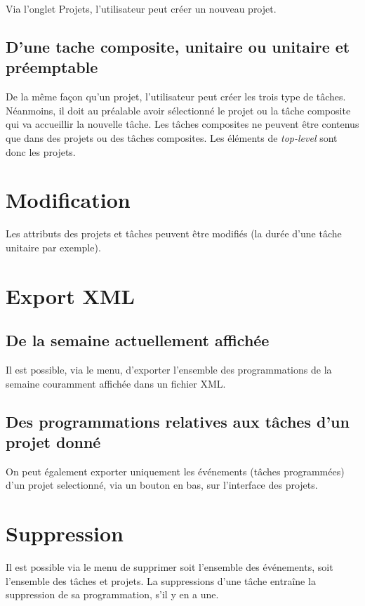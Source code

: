 Via l'onglet \og Projets\fg{}, l'utilisateur peut créer un nouveau projet.

\subsection{D'une tache composite, unitaire ou unitaire et préemptable}

De la même façon qu'un projet, l'utilisateur peut créer les trois type de tâches. Néanmoins, il doit au préalable avoir sélectionné le projet ou la tâche composite qui va accueillir la nouvelle tâche. Les tâches composites ne peuvent être contenus que dans des projets ou des tâches composites. Les éléments de \og\textit{top-level}\fg{} sont donc les projets.

\section{Modification}

Les attributs des projets et tâches peuvent être modifiés (la durée d'une tâche unitaire par exemple).

\section{Export XML}
\subsection{De la semaine actuellement affichée}

Il est possible, via le menu, d'exporter l'ensemble des programmations de la semaine couramment affichée dans un fichier XML.

\subsection{Des programmations relatives aux tâches d'un projet donné}

On peut également exporter uniquement les événements (tâches programmées) d'un projet selectionné, via un bouton en bas, sur l'interface des projets.

\section{Suppression}

Il est possible via le menu de supprimer soit l'ensemble des événements, soit l'ensemble des tâches et projets. La suppressions d'une tâche entraîne la suppression de sa programmation, s'il y en a une.